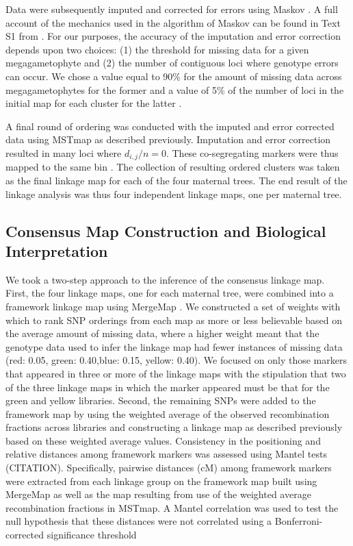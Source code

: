 \documentclass[11pt]{article}
\begin{document}
 
Data were subsequently imputed and corrected for errors using Maskov \citep{Ward:2013}. A full account of the mechanics used in the algorithm 
of Maskov can be found in Text S1 from \citet{Ward:2013}. For our purposes, the accuracy of the imputation and 
error correction depends upon two choices: (1) the threshold for missing data for a given megagametophyte and (2) the number of 
contiguous loci where genotype errors can occur. We chose a value equal to 90\% for the amount of 
missing data across megagametophytes for the former and a value of 5\% of the number of loci in the initial map for each 
cluster for the latter \citep[cf.][]{Ward:2013}.

A final round of ordering was conducted with the imputed and error corrected data using MSTmap as described previously. Imputation 
and error correction resulted in many loci where $d_{i,j}/n = 0$. These co-segregating markers were thus mapped to the same bin 
\citep[see][]{Wu:2008a}. The collection of resulting ordered clusters was taken as the final linkage map for each of the four maternal trees. 
The end result of the linkage analysis was thus four independent linkage maps, one per maternal tree.

\subsection*{Consensus Map Construction and Biological Interpretation}\label{ss:consensus}
We took a two-step approach to the inference of the consensus linkage map. First, the four linkage maps, one for each maternal tree, were combined
into a framework linkage map using MergeMap \citep{Wu:2008b}.  
We constructed a set of weights with which to rank SNP orderings from each map as more or less believable based on the average 
amount of missing data, where a higher weight meant that the genotype data used to infer the linkage map had fewer instances
of missing data (red: 0.05, green: 0.40,blue: 0.15, yellow: 0.40). We focused on only those markers that appeared in three or more of the linkage maps 
with the stipulation that two of the three linkage maps in which the marker appeared must be that for the green and yellow libraries.
Second, the remaining SNPs were added to the framework map by
using the weighted average of the observed recombination fractions across libraries and constructing a linkage map as described previously
based on these weighted average values. Consistency in the positioning and relative distances among framework markers was assessed using
Mantel tests (CITATION). Specifically, pairwise distances (cM) among framework markers were extracted from each linkage group on 
the framework map built using MergeMap as well as the map resulting from use of the weighted average recombination fractions in MSTmap. 
A Mantel correlation was used to test the null hypothesis that  these distances were not correlated using a Bonferroni-corrected significance threshold 
\end{document}
